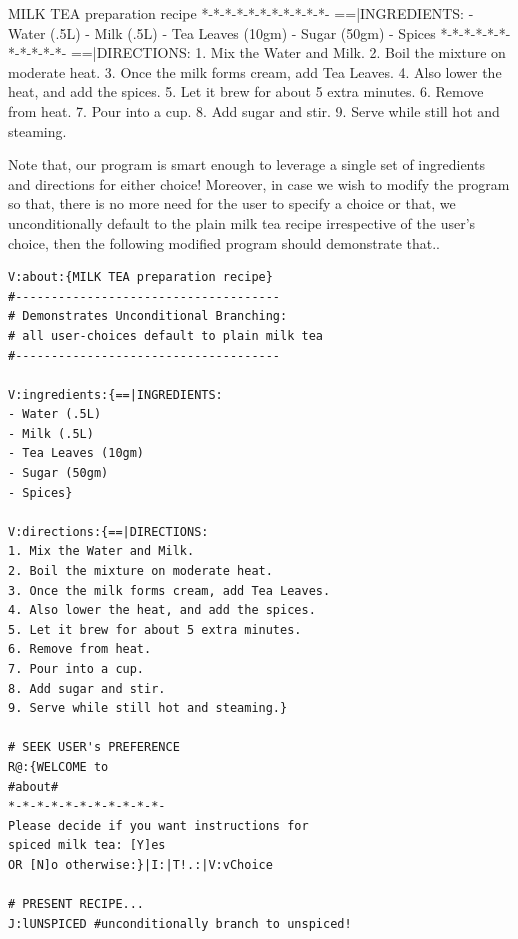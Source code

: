 \documentclass[a4paper, 18pt]{book} %
\begin{document}
{{{\begin{appendices}
   \begin{tcbverbatim}[title=Spiced Milk TEA Recipe]
[SPICED] MILK TEA preparation recipe
*-*-*-*-*-*-*-*-*-*-*-
==|INGREDIENTS:
- Water (.5L)
- Milk (.5L)
- Tea Leaves (10gm)
- Sugar (50gm)
- Spices
*-*-*-*-*-*-*-*-*-*-*-
==|DIRECTIONS:
1. Mix the Water and Milk.
2. Boil the mixture on moderate heat.
3. Once the milk forms cream, add Tea Leaves.
4. Also lower the heat, and add the spices.
5. Let it brew for about 5 extra minutes.
6. Remove from heat.
7. Pour into a cup.
8. Add sugar and stir.
9. Serve while still hot and steaming.
    \end{tcbverbatim}
    
    
    \vspace{2em}
    
    Note that, our program is smart enough to leverage a single set of ingredients and directions for either choice! Moreover, in case we wish to modify the program so that, there is no more need for the user to specify a choice or that, we unconditionally default to the plain milk tea recipe irrespective of the user's choice, then the following modified program should demonstrate that..
    

    
      \begin{tcolorbox}[teaterminalstyle, title=Unconditional Branching in TEA: MILK TEA RECIPE Presenter, breakable]
      \begin{lstlisting}[language=TEA,breaklines=true,]
V:about:{MILK TEA preparation recipe}
#-------------------------------------
# Demonstrates Unconditional Branching:
# all user-choices default to plain milk tea
#-------------------------------------

V:ingredients:{==|INGREDIENTS:
- Water (.5L)
- Milk (.5L)
- Tea Leaves (10gm)
- Sugar (50gm)
- Spices}

V:directions:{==|DIRECTIONS:
1. Mix the Water and Milk.
2. Boil the mixture on moderate heat.
3. Once the milk forms cream, add Tea Leaves.
4. Also lower the heat, and add the spices.
5. Let it brew for about 5 extra minutes.
6. Remove from heat.
7. Pour into a cup.
8. Add sugar and stir.
9. Serve while still hot and steaming.}

# SEEK USER's PREFERENCE
R@:{WELCOME to
#about#
*-*-*-*-*-*-*-*-*-*-*-
Please decide if you want instructions for 
spiced milk tea: [Y]es
OR [N]o otherwise:}|I:|T!.:|V:vChoice

# PRESENT RECIPE...
J:lUNSPICED #unconditionally branch to unspiced!


\end{lstlisting}
\end{tcolorbox}
\end{appendices}}}}
\end{document}
